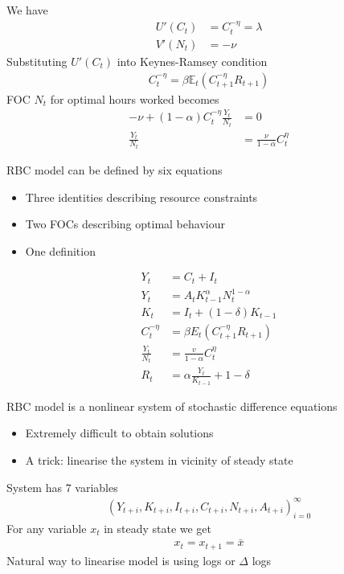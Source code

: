 \documentclass{beamer}
\begin{document}
\begin{frame}
 We have
 \begin{align}
  U'(C_t) &= C_t^{-\eta}=\lambda\\
  V'(N_t) &= -\nu
 \end{align}
  Substituting $U'(C_t)$ into Keynes-Ramsey condition   
\begin{align}
  C^{-\eta}_t=\beta \mathbb{E}_t(C^{-\eta}_{t+1}R_{t+1})
\end{align}
FOC $N_t$ for optimal hours worked becomes
\begin{align}
  -\nu +(1-\alpha)C^{-\eta}_t \frac{Y_t}{N_t} &= 0 \\ \nonumber
  \frac{Y_t}{N_t} &= \frac{\nu}{1-\alpha}C_t^{\eta}
\end{align}
\end{frame}
\begin{frame}
RBC model can be defined by six equations
\begin{itemize}
  \item Three identities describing resource constraints  
  \item Two FOCs describing optimal behaviour
  \item One definition
\end{itemize}
\begin{align}
  Y_t &= C_t +I_t\\
  Y_t &= A_tK^{\alpha}_{t-1}N^{1-\alpha}_t\\
  K_t &= I_t+(1-\delta)K_{t-1}\\
  C^{-\eta}_t &= \beta E_t(C^{-\eta}_{t+1}R_{t+1})\\
  \frac{Y_t}{N_t} &= \frac{v}{1-\alpha}C^{\eta}_t\\
  R_t &= \alpha \frac{Y_t}{K_{t-1}}+1-\delta
\end{align}
\end{frame}

\begin{frame}
  RBC model is a nonlinear system of stochastic difference equations
  \begin{itemize}
     \item Extremely difficult to obtain solutions 
     \item A trick: linearise the system in vicinity of steady state
   \end{itemize} 
   \medskip
  System has 7 variables
\begin{align*}
     (Y_{t+i},K_{t+i},I_{t+i},C_{t+i},N_{t+i},A_{t+i})_{i=0}^{\infty}
   \end{align*}   
   \medskip
   For any variable $x_t$ in steady state we get
   \begin{align}
     x_t=x_{t+1}=\bar{x}
   \end{align}
   \medskip
   Natural way to linearise model is using logs or $\Delta$ logs
\end{frame}
\end{document}
